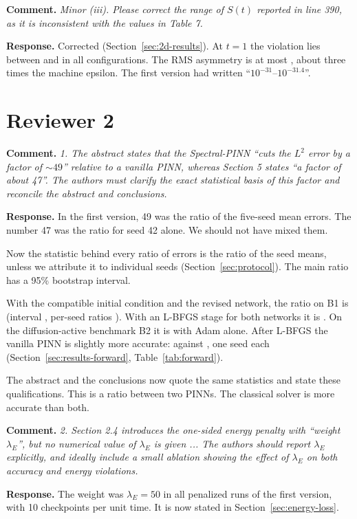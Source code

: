 \documentclass[11pt]{article}
\newcommand{\rc}[1]{\par\medskip\noindent\textbf{Comment.} \emph{#1}\par\smallskip\noindent\textbf{Response.} }
\begin{document}
\rc{Minor (iii). Please correct the range of $S(t)$ reported in line 390, as it is inconsistent with the values in Table 7.}
Corrected (Section~\ref{sec:2d-results}). At $t=1$ the violation lies between  and  in all configurations. The RMS asymmetry is at most , about three times the machine epsilon. The first version had written ``$10^{-31}$--$10^{-31.4}$''.

\section*{Reviewer 2}

\rc{1. The abstract states that the Spectral-PINN ``cuts the $L^2$ error by a factor of $\sim49$'' relative to a vanilla PINN, whereas Section 5 states ``a factor of about 47''. The authors must clarify the exact statistical basis of this factor and reconcile the abstract and conclusions.}
In the first version, 49 was the ratio of the five-seed mean errors. The number 47 was the ratio for seed 42 alone. We should not have mixed them.

Now the statistic behind every ratio of errors is the ratio of the seed means, unless we attribute it to individual seeds (Section~\ref{sec:protocol}). The main ratio has a 95\% bootstrap interval.

With the compatible initial condition and the revised network, the ratio on B1 is  (interval , per-seed ratios ). With an L-BFGS stage for both networks it is . On the diffusion-active benchmark B2 it is  with Adam alone. After L-BFGS the vanilla PINN is slightly more accurate:  against , one seed each (Section~\ref{sec:results-forward}, Table~\ref{tab:forward}).

The abstract and the conclusions now quote the same statistics and state these qualifications. This is a ratio between two PINNs. The classical solver is more accurate than both.

\rc{2. Section 2.4 introduces the one-sided energy penalty with ``weight $\lambda_E$'', but no numerical value of $\lambda_E$ is given ... The authors should report $\lambda_E$ explicitly, and ideally include a small ablation showing the effect of $\lambda_E$ on both accuracy and energy violations.}
The weight was $\lambda_E=50$ in all penalized runs of the first version, with 10 checkpoints per unit time. It is now stated in Section~\ref{sec:energy-loss}.
\end{document}
